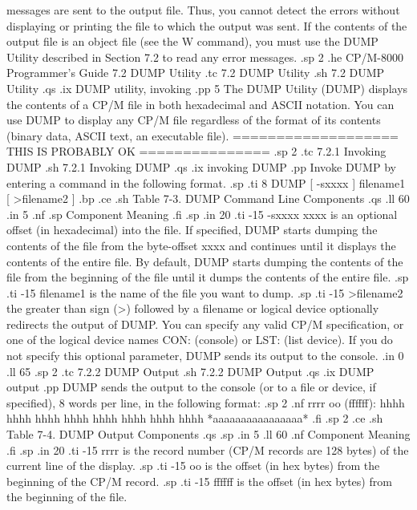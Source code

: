 messages are sent to the output file.  Thus, you cannot detect the 
errors without displaying or printing the file to which the 
output was sent.  If the contents of the output
file is an object file (see the W command), you must use the
DUMP Utility described in Section 7.2 to read any error messages. 
.sp 2
.he CP/M-8000 Programmer's Guide                     7.2  DUMP Utility
.tc    7.2 DUMP Utility
.sh
7.2  DUMP Utility
.qs
.ix DUMP utility, invoking
.pp 5
The DUMP Utility (DUMP) displays the contents of a CP/M file in both
hexadecimal and ASCII notation.  You can use DUMP to display any CP/M file
regardless of the format of its contents (binary data, ASCII text, an
executable file). 
=================== THIS IS PROBABLY OK ===============
.sp 2
.tc         7.2.1  Invoking DUMP
.sh
7.2.1  Invoking DUMP
.qs
.ix invoking DUMP
.pp
Invoke DUMP by entering a command in the following format.
.sp
.ti 8 
DUMP [ -sxxxx ] filename1 [ >filename2 ]
.bp
.ce
.sh
Table 7-3.  DUMP Command Line Components
.qs
.ll 60
.in 5
.nf
.sp
Component                      Meaning
.fi
.sp
.in 20
.ti -15
-sxxxx         xxxx is an optional offset (in hexadecimal) into the file. 
If specified, DUMP starts dumping the contents of the file from the
byte-offset xxxx and continues until it displays the contents of the entire
file.  By default, DUMP starts dumping the contents of the file from the
beginning of the file until it dumps the contents of the entire file. 
.sp 
.ti -15
filename1      is the name of the file you want to dump.
.sp 
.ti -15
>filename2     the greater than sign (>) followed by a filename or 
logical device optionally redirects
the output of DUMP.  You can specify
any valid CP/M specification, or one of the logical device names CON:
(console) or LST: (list device).  If you do not specify this optional 
parameter, DUMP sends its output to the console. 
.in 0
.ll 65
.sp 2
.tc         7.2.2  DUMP Output
.sh
7.2.2   DUMP Output
.qs
.ix DUMP output
.pp
DUMP sends the output to the console (or to a file or device, if 
specified), 8 words per line, in the following format:
.sp 2
.nf
rrrr oo (ffffff):  hhhh hhhh hhhh hhhh hhhh hhhh hhhh hhhh *aaaaaaaaaaaaaaaa*
.fi
.sp 2
.ce
.sh
Table 7-4.  DUMP Output Components
.qs
.sp
.in 5
.ll 60
.nf
Component                      Meaning
.fi
.sp
.in 20
.ti -15
rrrr           is the record number (CP/M records are 128 bytes)
of the current line of the display.
.sp
.ti -15
oo             is the offset (in hex bytes) from the beginning of
the CP/M record.
.sp
.ti -15
ffffff         is the offset (in hex bytes) from the beginning of 
the file.
